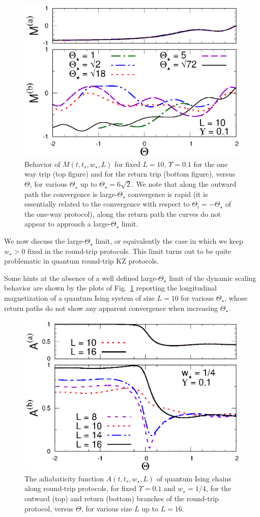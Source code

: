 \begin{figure}[!htb]
\centering
  \includegraphics[width=0.65\columnwidth]{imm/headDiffThsY01L10X.eps}
 \caption{ Behavior of $M(t,t_s,w_\star,L)$ for fixed $L = 10$,
   $\Upsilon = 0.1$ for the one way trip (top figure) and for the
   return trip (bottom figure), versus $\Theta$, for various
   $\Theta_\star$ up to $\Theta_\star = 6\sqrt{2}$.  We note that
   along the outward path the convergence is large-$\Theta_\star$
   convergence is rapid (it is essentially related to the convergence
   with respect to $\Theta_i=-\Theta_\star$ of the one-way protocol),
   along the return path the curves do not appear to approach a
   large-$\Theta_\star$ limit.}
  \label{diffThetaStar}
\end{figure}


We now discuss the large-$\Theta_\star$ limit, or equivalently the
case in which we keep $w_\star>0$ fixed in the round-trip protocols.
This limit turns out to be quite problematic in quantum round-trip KZ
protocols.

  
Some hints at the absence of a well defined large-$\Theta_\star$ limit
of the dynamic scaling behavior are shown by the plots of
Fig.~\ref{diffThetaStar} reporting the longitudinal magnetization of a
quantum Ising system of size $L=10$ for various $\Theta_\star$, whose
return paths do not show any apparent convergence when increasing
$\Theta_\star$.



\begin{figure}[!htb]
\centering
  \includegraphics[width=0.65\columnwidth]{imm/headIQMY01W025A.eps}
  \caption{ The adiabaticity function $A(t,t_s,w_\star,L)$ of quantum
    Ising chains along round-trip protocols, for fixed $\Upsilon =
    0.1$ and $w_\star = 1/4$, for the outward (top) and return
    (bottom) branches of the round-trip protocol, versus $\Theta$, for
    various size $L$ up to $L=16$.  }
  \label{roundtripAW}
\end{figure}


